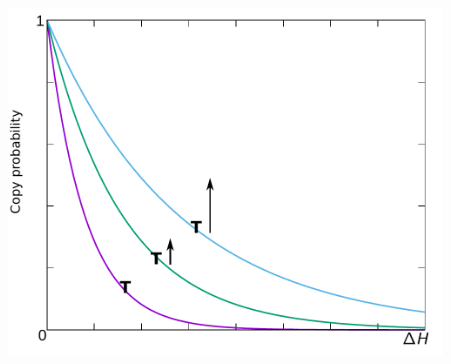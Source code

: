 \documentclass[compress]{beamer}
\begin{document}
\begin{frame}
\begin{columns}
    \begin{column}{0.49\textwidth}
    \includegraphics[width=0.9\textwidth]{figures/copyprob.pdf}
     \end{column}
    \begin{column}{0.49\textwidth}
    \end{column}
   \end{columns}
\end{frame} 
\end{document}
